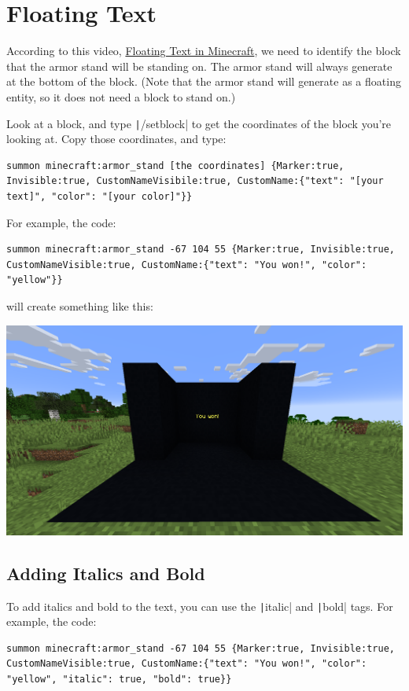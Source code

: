 \section{Floating Text}
\label{sec:floating_text}

According to this video, \href{https://www.youtube.com/watch?v=3gAlT9OWINg8}{Floating Text in Minecraft}, we need to identify the block that the armor stand will be standing on. The armor stand will always generate at the bottom of the block. (Note that the armor stand will generate as a floating entity, so it does not need a block to stand on.)

Look at a block, and type \texttt|/setblock| to get the coordinates of the block you're looking at. Copy those coordinates, and type:
\begin{verbatim}
summon minecraft:armor_stand [the coordinates] {Marker:true, Invisible:true, CustomNameVisibile:true, CustomName:{"text": "[your text]", "color": "[your color]"}}
\end{verbatim}
For example, the code:
\begin{verbatim}
summon minecraft:armor_stand -67 104 55 {Marker:true, Invisible:true, CustomNameVisible:true, CustomName:{"text": "You won!", "color": "yellow"}}
\end{verbatim}
will create something like this:
\begin{center}
    \includegraphics[width=\textwidth]{images/you_won_.png}
\end{center}

\newpage

\subsection{Adding Italics and Bold}
\label{subsec:adding_italics_and_bold}

To add italics and bold to the text, you can use the \texttt|italic| and \texttt|bold| tags. For example, the code:
\begin{verbatim}
summon minecraft:armor_stand -67 104 55 {Marker:true, Invisible:true, CustomNameVisible:true, CustomName:{"text": "You won!", "color": "yellow", "italic": true, "bold": true}}
\end{verbatim}